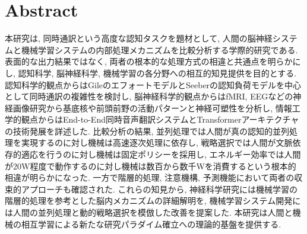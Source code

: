 \section*{Abstract}

本研究は, 同時通訳という高度な認知タスクを題材として, 人間の脳神経システムと機械学習システムの内部処理メカニズムを比較分析する学際的研究である.
表面的な出力結果ではなく, 両者の根本的な処理方式の相違と共通点を明らかにし, 認知科学, 脳神経科学, 機械学習の各分野への相互的知見提供を目的とする.
認知科学的観点からはGileのエフォートモデルとSeeberの認知負荷モデルを中心として同時通訳の複雑性を検討し, 脳神経科学的観点からはfMRI, EEGなどの神経画像研究から基底核や前頭前野の活動パターンと神経可塑性を分析し, 情報工学的観点からはEnd-to-End同時音声翻訳システムとTransformerアーキテクチャの技術発展を詳述した.
比較分析の結果, 並列処理では人間が真の認知的並列処理を実現するのに対し機械は高速逐次処理に依存し, 戦略選択では人間が文脈依存的適応を行うのに対し機械は固定ポリシーを採用し, エネルギー効率では人間が20W程度で動作するのに対し機械は数百から数千Wを消費するという根本的相違が明らかになった.
一方で階層的処理, 注意機構, 予測機能において両者の収束的アプローチも確認された.
これらの知見から, 神経科学研究には機械学習の階層的処理を参考とした脳内メカニズムの詳細解明を, 機械学習システム開発には人間の並列処理と動的戦略選択を模倣した改善を提案した.
本研究は人間と機械の相互学習による新たな研究パラダイム確立への理論的基盤を提供する.